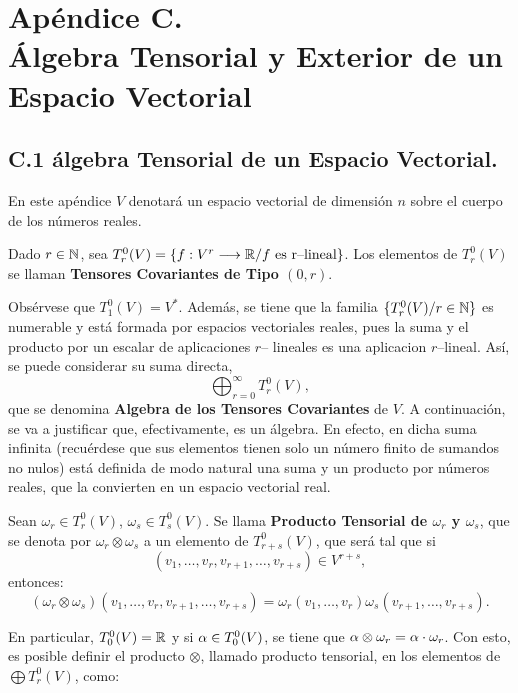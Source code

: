 \documentclass[cursovd_portada.tex]{subfiles}
\begin{document}
\chapter*{Apéndice C.\\\'Algebra Tensorial y Exterior de un Espacio Vectorial}
\section*{C.1 álgebra Tensorial de un Espacio Vectorial.}
 \hs En este apéndice
$V$ denotará un espacio vectorial de dimensión $n$ sobre el cuerpo de los números reales.
\begin{defiap}
Dado $r\in\mathbb{N}$, sea $T^0_r(V)=\{f:V^r\longrightarrow\mathbb{R} / f \mbox{ es r--lineal}\}$. Los elementos de $T^0_r(V)$ se llaman {\bf
Tensores Covariantes de Tipo $(0,r)$}.
\end{defiap}
\par\bigskip
Obsérvese que $T^0_1(V)=V^*$. Además, se tiene que la familia $\{T^0_r(V)/r\in\mathbb{N}\}$ es numerable y está formada
por espacios vectoriales reales, pues la suma y el producto por un escalar de aplicaciones $r$-- lineales es una
aplicacion $r$--lineal. Así, se puede considerar su suma directa,
$$\bigoplus_{r=0}^\infty T^0_r(V),$$
que se denomina {\bf Algebra de los Tensores Covariantes} de $V$. A con\-ti\-nua\-ción, se va a justificar que,
efectivamente, es un álgebra. En efecto, en dicha suma infinita (recuérdese que sus elementos tienen solo un
número finito de sumandos no nulos) está definida de modo natural una suma y un producto por números reales, que
la convierten en un espacio vectorial real.
\begin{defiap}
Sean $\omega_r\in T^0_r(V)$, $\omega_s\in T^0_s(V)$. Se llama {\bf Producto Tensorial de $\omega_r$ y $\omega_s$},
que se denota por $\omega_r\otimes \omega_s$ a un elemento de $T^0_{r+s}(V)$, que será tal que si
$$(v_1,\dots ,v_r,v_{r+1},\dots ,v_{r+s})\in V^{r+s},$$
entonces:
$$(\omega_r\otimes\omega_s)(v_1,\dots ,v_r,v_{r+1},\dots ,v_{r+s})=
\omega_r(v_1,\dots ,v_r)\omega_s(v_{r+1},\dots,v_{r+s}).$$
\end{defiap}
\par\bigskip
En particular, $T_0^0(V)=\mathbb{R}$ y si $\alpha\in T^0_0(V)$, se tiene que $\alpha\otimes \omega_r=\alpha\cdot\omega_r$. Con esto,
es posible definir el producto $\otimes$, llamado producto tensorial, en los elementos de $\bigoplus T^0_r(V)$, como:
\end{document}
